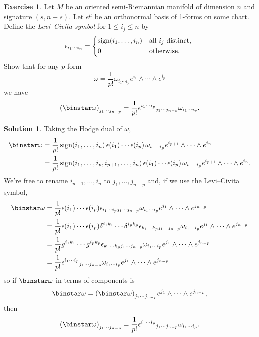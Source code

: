 \documentclass[11pt, a4paper]{report}
\theoremstyle{definition}
\newtheorem{exercise}{Exercise}[part]
\newtheorem{solution}{Solution}[part]
\newenvironment{ex}{\begin{exercise}}{\end{exercise}\pagebreak[1]}
\newenvironment{sol}{\begin{solution}}{\end{solution}\pagebreak[3]}
\renewcommand{\leq}{\leqslant}
\newcommand*{\op}[1]{\ensuremath\mathop{}\mathopen{}#1}
\renewcommand*{\star}{\op{\binstar}\mathord{}}
\DeclareMathOperator{\sign}{sign}
\begin{document}
\begin{ex}

Let $M$ be an oriented semi-Riemannian manifold of dimension $n$ and signature $(s, n - s)$. Let $e^\mu$ be an orthonormal basis of 1-forms on some chart. Define the \emph{Levi--Civita symbol} for $1 \leq i_j \leq n$ by
\[
    \epsilon_{i_1 \cdots i_n} = \begin{dcases*}
            \sign(i_1, \ldots, i_n) & \text{all $i_j$ distinct}, \\
            0                       & otherwise.
        \end{dcases*}
\]
Show that for any $p$-form
\[
    \omega = \frac{1}{p!} \omega_{i_1 \cdots i_p} e^{i_1} \wedge \cdots \wedge e^{i_p}
\]
we have
\[
    {(\star \omega)}_{j_1 \cdots j_{n - p}} = \frac{1}{p!} {\epsilon^{i_1 \cdots i_p}}_{j_1 \cdots j_{n - p}} \omega_{i_1 \cdots i_p}.
\]

\end{ex}

\begin{sol}

Taking the Hodge dual of $\omega$,
\begin{align*}
    \star \omega &= \frac{1}{p!} \sign(i_1, \ldots, i_n) \, \epsilon(i_1) \cdots \epsilon(i_p) \, \omega_{i_1 \cdots i_p} e^{i_{p + 1}} \wedge \cdots \wedge e^{i_n} \\
        &= \frac{1}{p!} \sign(i_1, \ldots, i_p, i_{p + 1}, \ldots, i_n) \, \epsilon(i_1) \cdots \epsilon(i_p) \, \omega_{i_1 \cdots i_p} e^{i_{p + 1}} \wedge \cdots \wedge e^{i_n}.
\end{align*}
We're free to rename $i_{p + 1}, \ldots, i_n$ to $j_1, \ldots, j_{n - p}$ and, if we use the Levi--Civita symbol,
\begin{align*}
    \star \omega &= \frac{1}{p!} \epsilon(i_1) \cdots \epsilon(i_p) \epsilon_{i_1 \cdots i_p j_1 \cdots j_{n - p}} \omega_{i_1 \cdots i_p} e^{j_1} \wedge \cdots \wedge e^{j_{n - p}} \\
        &= \frac{1}{p!} \epsilon(i_1) \cdots \epsilon(i_p) \delta^{i_1 k_1} \cdots \delta^{i_p k_p} \epsilon_{k_1 \cdots k_p j_1 \cdots j_{n - p}} \omega_{i_1 \cdots i_p} e^{j_1} \wedge \cdots \wedge e^{j_{n - p}} \\
        &= \frac{1}{p!} g^{i_1 k_1} \cdots g^{i_p k_p} \epsilon_{k_1 \cdots k_p j_1 \cdots j_{n - p}} \omega_{i_1 \cdots i_p} e^{j_1} \wedge \cdots \wedge e^{j_{n - p}} \\
        &= \frac{1}{p!} {\epsilon^{i_1 \cdots i_p}}_{j_1 \cdots j_{n - p}} \omega_{i_1 \cdots i_p} e^{j_1} \wedge \cdots \wedge e^{j_{n - p}}
\end{align*}
so if $\star \omega$ in terms of components is
\[
    \star \omega = {(\star \omega)}_{j_1 \cdots j_{n - p}} e^{j_1} \wedge \cdots \wedge e^{j_{n - p}},
\]
then
\[
    {(\star \omega)}_{j_1 \cdots j_{n - p}} = \frac{1}{p!} {\epsilon^{i_1 \cdots i_p}}_{j_1 \cdots j_{n - p}} \omega_{i_1 \cdots i_p}.
\]

\end{sol}
\end{document}
